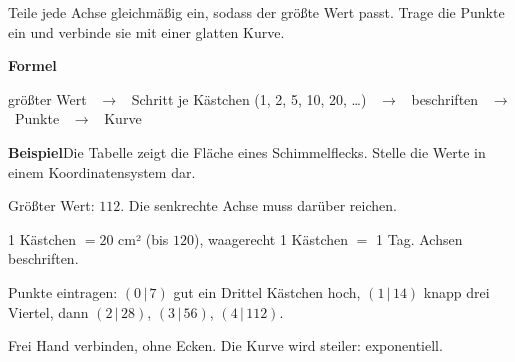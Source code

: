 \documentclass[11pt]{article}
\newlength{\kr}
\begin{document}
\noindent Teile jede Achse gleichmäßig ein, sodass der größte Wert passt. Trage die Punkte ein und verbinde sie mit einer glatten Kurve.\par\medskip
\noindent\textbf{Formel}\par\nopagebreak\noindent\hspace*{4mm}\begin{minipage}{\dimexpr\linewidth-4mm\relax}größter Wert \ $\to$ \ Schritt je Kästchen (1, 2, 5, 10, 20, \dots) \ $\to$ \ beschriften \ $\to$ \ Punkte \ $\to$ \ Kurve\end{minipage}\par\medskip
\noindent\textbf{Beispiel}\quad Die Tabelle zeigt die Fläche eines Schimmelflecks. Stelle die Werte in einem Koordinatensystem dar. \par\smallskip
\noindent\begin{minipage}[t]{0.6\linewidth}\vspace{0pt}\par\noindent{}Größter Wert: $112$. Die senkrechte Achse muss darüber reichen.\par\smallskip\par\noindent{}1 Kästchen $= 20$ cm² (bis $120$), waagerecht 1 Kästchen $=$ 1 Tag. Achsen beschriften.\par\smallskip\par\noindent{}Punkte eintragen: $(0\,|\,7)$ gut ein Drittel Kästchen hoch, $(1\,|\,14)$ knapp drei Viertel, dann $(2\,|\,28)$, $(3\,|\,56)$, $(4\,|\,112)$.\par\smallskip\par\noindent{}Frei Hand verbinden, ohne Ecken. Die Kurve wird steiler: exponentiell.\par\smallskip\end{minipage}\hfill
\begin{minipage}[t]{0.37\linewidth}\vspace{0pt}\centering {}\end{minipage}\par\medskip
\end{document}
